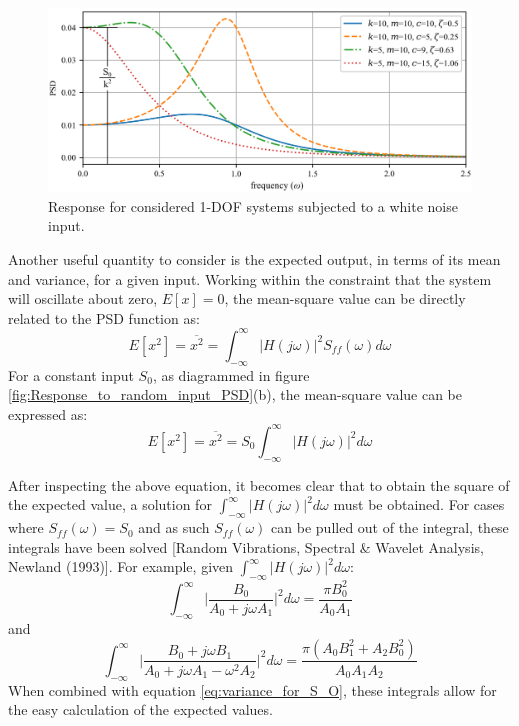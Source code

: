 \documentclass[12pt,letter]{article}
\begin{document}
\begin{example}
\begin{figure}[H]
		\centering
		\includegraphics[width=1\textwidth]{../figures/response_to_white_noise_with_annotation.png}
		\caption{Response for considered 1-DOF systems subjected to a white noise input.}
	\end{figure}
\end{example}  

Another useful quantity to consider is the expected output, in terms of its mean and variance, for a given input. Working within the constraint that the system will oscillate about zero, $E[x]=0$, the mean-square value can be directly related to the PSD function as:
\begin{equation}
E[x^2] = \overline{x^2} =   \int_{-\infty}^{\infty} |H(j\omega)|^2 S_{ff}(\omega) d\omega
\end{equation}
For a constant input $S_0$, as diagrammed in figure \ref{fig:Response_to_random_input_PSD}(b), the mean-square value can be expressed as:
\begin{equation}
E[x^2] = \overline{x^2} =   S_{0} \int_{-\infty}^{\infty} |H(j\omega)|^2 d\omega
\label{eq:variance_for_S_O}
\end{equation}

After inspecting the above equation, it becomes clear that to obtain the square of the expected value, a solution for  $\int_{-\infty}^{\infty} |H(j\omega)|^2 d\omega$ must be obtained. For cases where $S_{ff}(\omega) = S_0$ and as such $S_{ff}(\omega)$ can be pulled out of the integral, these integrals have been solved [Random Vibrations, Spectral \& Wavelet Analysis, Newland (1993)]. For example, given $\int_{-\infty}^{\infty} |H(j\omega)|^2 d\omega$:
\begin{equation}
\int_{-\infty}^{\infty} \bigg|\frac{B_0}{A_0+j \omega A_1} \bigg|^2 d\omega = \frac{\pi B_0^2}{A_0 A_1}
\end{equation} 
and
\begin{equation}
\int_{-\infty}^{\infty} \bigg|\frac{B_0 + j \omega B_1}{A_0+j \omega A_1 - \omega^2 A_2} \bigg|^2 d\omega = \frac{\pi (A_0 B_1^2 + A_2 B_0^2)}{A_0 A_1 A_2}
\end{equation} 
When combined with equation \ref{eq:variance_for_S_O}, these integrals allow for the easy calculation of the expected values. 
\end{document}
